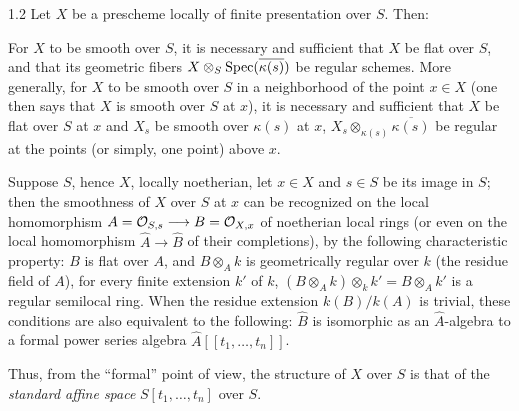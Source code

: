 \begin{proposition}{1.2}\label{XI.1.2}
Let $X$ be a prescheme locally of finite presentation over $S$. Then:
\begin{enumeratei}
\item For $X$ to be smooth over $S$, it is necessary and sufficient that $X$ be flat over $S$, and that its geometric fibers $X\otimes_S\operatorname{Spec}(\overline{\kappa(s)})$ be regular schemes. More generally, for $X$ to be smooth over $S$ in a neighborhood of the point $x\in X$ (one then says that $X$ is smooth over $S$ at $x$), it is necessary and sufficient that $X$ be flat over $S$ at $x$ and $X_s$ be smooth over $\kappa(s)$ at $x$, \ie $X_s\otimes_{\kappa(s)}\overline{\kappa(s)}$ be regular at the points (or simply, one point) above $x$.
\item Suppose $S$, hence $X$, locally noetherian, let $x\in X$ and $s\in S$ be its image in $S$; then the smoothness of $X$ over $S$ at $x$ can be recognized on the local homomorphism $A=\mathcal{O}_{S,s}\longrightarrow B=\mathcal{O}_{X,x}$ of noetherian local rings (or even on the local homomorphism $\widehat A\to\widehat B$ of their completions), by the following characteristic property: $B$ is flat over $A$, and $B\otimes_A k$ is geometrically regular over $k$ (the residue field of $A$), \ie for every finite extension $k'$ of $k$, $(B\otimes_A k)\otimes_k k'=B\otimes_A k'$ is a regular semilocal ring. When the residue extension $k(B)/k(A)$ is trivial, these conditions are also equivalent to the following: $\widehat B$ is isomorphic as an $\widehat A$-algebra to a formal power series algebra $\widehat A[[t_1,\ldots,t_n]]$.
\end{enumeratei}
\end{proposition}

Thus, from the ``formal'' point of view, the structure of $X$ over $S$ is that of the \emph{standard affine space} $S[t_1,\ldots,t_n]$ over $S$.

